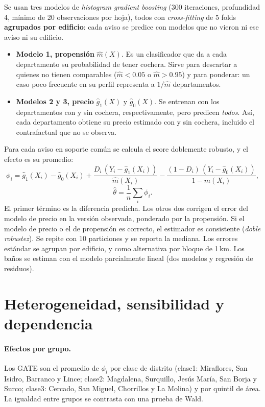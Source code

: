 Se usan tres modelos de \textit{histogram gradient boosting} (300 iteraciones, profundidad 4, mínimo de 20 observaciones por hoja), todos con \textit{cross-fitting} de 5 folds \textbf{agrupados por edificio}: cada aviso se predice con modelos que no vieron ni ese aviso ni su edificio.
\begin{itemize}[leftmargin=*,itemsep=1pt]
\item \textbf{Modelo 1, propensión} $\hat m(X)$. Es un clasificador que da a cada departamento su probabilidad de tener cochera. Sirve para descartar a quienes no tienen comparables ($\hat m<0.05$ o $\hat m>0.95$) y para ponderar: un caso poco frecuente en su perfil representa a $1/\hat m$ departamentos.
\item \textbf{Modelos 2 y 3, precio} $\hat g_1(X)$ y $\hat g_0(X)$. Se entrenan con los departamentos con y sin cochera, respectivamente, pero predicen \emph{todos}. Así, cada departamento obtiene su precio estimado con y sin cochera, incluido el contrafactual que no se observa.
\end{itemize}
Para cada aviso en soporte común se calcula el score doblemente robusto, y el efecto es su promedio:
\begin{equation}\label{eq:aipw}
\phi_i=\hat g_1(X_i)-\hat g_0(X_i)+\frac{D_i\,(Y_i-\hat g_1(X_i))}{\hat m(X_i)}-\frac{(1-D_i)\,(Y_i-\hat g_0(X_i))}{1-\hat m(X_i)},
\end{equation}
\[\hat\theta=\frac{1}{n}\sum_i\phi_i.\]
El primer término es la diferencia predicha. Los otros dos corrigen el error del modelo de precio en la versión observada, ponderado por la propensión. Si el modelo de precio o el de propensión es correcto, el estimador es consistente (\emph{doble robustez}). Se repite con 10 particiones y se reporta la mediana. Los errores estándar se agrupan por edificio, y como alternativa por bloque de 1\,km. Los baños se estiman con el modelo parcialmente lineal (dos modelos y regresión de residuos).

\section{Heterogeneidad, sensibilidad y dependencia}\label{sec:sens}

\paragraph{Efectos por grupo.} Los GATE son el promedio de $\phi_i$ por clase de distrito (clase1: Miraflores, San Isidro, Barranco y Lince; clase2: Magdalena, Surquillo, Jesús María, San Borja y Surco; clase3: Cercado, San Miguel, Chorrillos y La Molina) y por quintil de área. La igualdad entre grupos se contrasta con una prueba de Wald.

